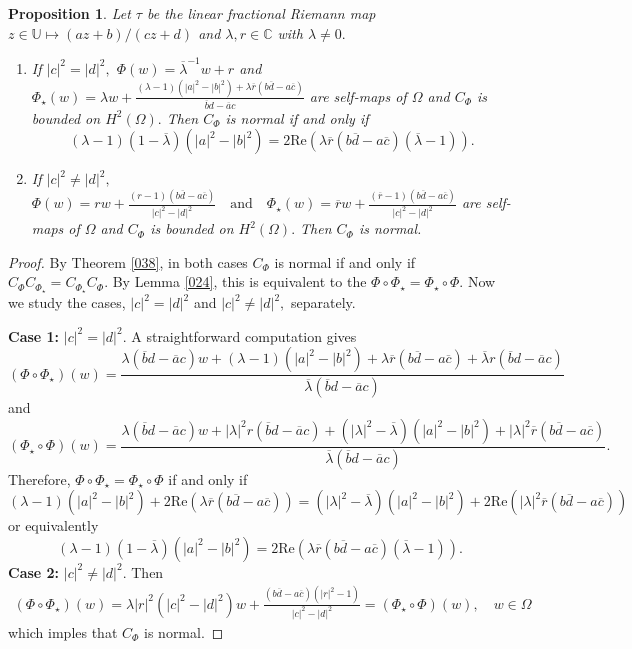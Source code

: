 \documentclass[11pt]{amsart}%
\newtheorem{pps}[thm]{Proposition}
\theoremstyle{definition}
\theoremstyle{remark}
\numberwithin{equation}{section}
\begin{document}
\begin{pps}
 Let $\tau$ be the linear fractional Riemann map $z\in \mathbb{U} \mapsto (az+b)/(cz+d)$ and $\lambda,r\in\mathbb{C}$ with $\lambda\neq0.$
 \begin{enumerate}
 \item If $|c|^2=|d|^2,$ $\Phi(w)=\overline{\lambda}^{-1}w+r$  and $\Phi_{\star}(w)=\lambda
 w+\frac{(\lambda-1)(|a|^{2}-|b|^{2})+\lambda\overline{r}(b\overline
 	{d}-a\overline{c})}{\overline{b}d-\overline{a}c}$
 are self-maps of $\Omega$ and $C_{\Phi}$ is bounded on $H^{2}(\Omega).$ Then $C_{\Phi}$ is normal if and only if
 \[
 (\lambda-1)(1-\overline{\lambda})(|a|^{2}-|b|^{2})=2\mathrm{Re}(\lambda
 \overline{r}(b\overline{d}-a\overline{c})(\overline{\lambda}-1)).
 \]
 \item If $|c|^2\neq |d|^2,$
 $\Phi(w)=rw+\frac{(r-1)(b\overline{d}-a\overline{c})}{|c|^{2}-|d|^{2}}%
 \quad\text{and}\quad\Phi_{\star}(w)=\overline{r}w+\frac{(\overline
 	{r}-1)(b\overline{d}-a\overline{c})}{|c|^{2}-|d|^{2}}$
 are self-maps of $\Omega$ and $C_{\Phi}$ is bounded on $H^{2}(\Omega).$ Then $C_{\Phi}$ is normal.
\end{enumerate}	
\end{pps}
\begin{proof}
By Theorem \ref{038}, in both cases $C_{\Phi}$ is normal if and only if $C_{\Phi}C_{\Phi_{\star}}=C_{\Phi_{\star}}C_{\Phi}.$ By Lemma \ref{024}, this is
equivalent to the $\Phi\circ\Phi_{\star}=\Phi_{\star}\circ\Phi.$ Now we study the cases, $|c|^2=|d|^2$ and $|c|^2\neq |d|^2,$ separately.
	
\textbf{Case 1:} $|c|^2=|d|^2.$ A straightforward
computation gives 
\[
(\Phi\circ\Phi_{\star})(w)=\frac{\lambda(\overline{b}d-\overline
	{a}c)w+(\lambda-1)(|a|^{2}-|b|^{2})+\lambda\overline{r}(b\overline
	{d}-a\overline{c})+\overline{\lambda}r(\overline{b}d-\overline{a}c)}%
{\overline{\lambda}(\overline{b}d-\overline{a}c)}%
\]
and 
\[
(\Phi_{\star}\circ\Phi)(w)=\frac{\lambda(\overline{b}d-\overline
	{a}c)w+|\lambda|^{2}r(\overline{b}d-\overline{a}c)+(|\lambda|^{2}%
	-\overline{\lambda})(|a|^{2}-|b|^{2})+|\lambda|^{2}\overline{r}(b\overline
	{d}-a\overline{c})}{\overline{\lambda}(\overline{b}d-\overline{a}c)}.
\]
Therefore, $\Phi\circ\Phi_{\star}=\Phi_{\star}\circ\Phi$ if and only if
\[
(\lambda-1)(|a|^{2}-|b|^{2})+2\mathrm{Re}(\lambda\overline{r}(b\overline
{d}-a\overline{c}))=(|\lambda|^{2}-\overline{\lambda})(|a|^{2}-|b|^{2}%
)+2\mathrm{Re}(|\lambda|^{2}\overline{r}(b\overline{d}-a\overline{c}))
\]
or equivalently
\[
(\lambda-1)(1-\overline{\lambda})(|a|^{2}-|b|^{2})=2\mathrm{Re}(\lambda
\overline{r}(b\overline{d}-a\overline{c})(\overline{\lambda}-1)).
\]	
\textbf{Case 2:} $|c|^2\neq |d|^2.$ Then	
\begin{align*}
(\Phi\circ\Phi_{\star})(w)=\lambda|r|^{2}(|c|^{2}-|d|^{2})w+\frac
{(b\overline{d}-a\overline{c})(|r|^{2}-1)}{|c|^{2}-|d|^{2}} = (\Phi_{\star}\circ\Phi)(w), \quad w\in \Omega
\end{align*}
which imples that $C_{\Phi}$ is normal.
\end{proof}
\end{document}
